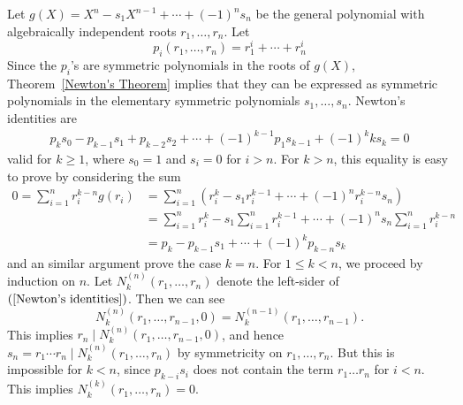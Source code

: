 \begin{example}
Let $g(X)=X^n-s_1X^{n-1}+\cdots+(-1)^ns_n$ be the general polynomial with algebraically independent roots $r_1,\dots,r_n$. Let
\[p_i(r_1,\dots,r_n)=r_1^i+\cdots+r_n^i\]
Since the $p_i$'s are symmetric polynomials in the roots of $g(X)$, Theorem~\ref{Newton's Theorem} implies that they can be expressed as symmetric polynomials in the elementary symmetric polynomials $s_1,\dots,s_n$. Newton's identities are
\begin{align}\label{Newton's identities}
p_ks_0-p_{k-1}s_1+p_{k-2}s_2+\cdots+(-1)^{k-1}p_1s_{k-1}+(-1)^kks_k=0
\end{align}
valid for $k\geq 1$, where $s_0=1$ and $s_i=0$ for $i>n$. For $k>n$, this equality is easy to prove by considering the sum
\begin{align*}
0=\sum_{i=1}^{n}r_i^{k-n}g(r_i)&=\sum_{i=1}^{n}(r_i^{k}-s_1r_i^{k-1}+\cdots+(-1)^nr_i^{k-n}s_n)\\
&=\sum_{i=1}^{n}r_i^k-s_1\sum_{i=1}^{n}r_i^{k-1}+\cdots+(-1)^ns_n\sum_{i=1}^{n}r_i^{k-n}\\
&=p_k-p_{k-1}s_1+\cdots+(-1)^kp_{k-n}s_k
\end{align*}
and an similar argument prove the case $k=n$. For $1\leq k<n$, we proceed by induction on $n$. Let $N_k^{(n)}(r_1,\dots,r_n)$ denote the left-sider of $(\ref{Newton's identities})$. Then we can see
\[N^{(n)}_k(r_1,\dots,r_{n-1},0)=N^{(n-1)}_k(r_1,\dots,r_{n-1}).\]
This implies $r_n\mid N^{(n)}_k(r_1,\dots,r_{n-1},0)$, and hence $s_n=r_1\cdots r_n\mid N^{(n)}_k(r_1,\dots,r_n)$ by symmetricity on $r_1,\dots,r_n$. But this is impossible for $k<n$, since $p_{k-i}s_i$ does not contain the term $r_1\dots r_n$ for $i<n$. This implies $N_k^{(k)}(r_1,\dots,r_n)=0$. 
\end{example}
\begin{example}

\end{example}
